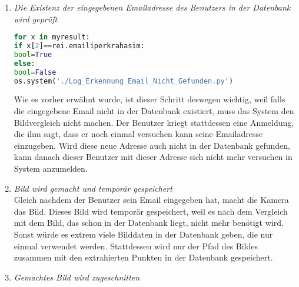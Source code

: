 \begin{enumerate}
Es ist wichtig zu erw{\"a}hnen, es dass für die Umsetzung dieses Systems notwendig ist, die verschiedenen Skripten miteinander zu verbinden.  Deshalb müssen sie innerhalb anderer Skripten angerufen werden. Das wird durch Variablen gemacht. Deshalb ist das Importieren des Pakets sys n{\"o}tig. Der Benutzer gibt seine Emailadresse an, die danach verwendet wird, um in der Datenbank schneller auf die Benutzerbilddaten zuzugreifen. Es wurde deshalb die Emailadresse(und nicht Vorname, Nachname usw.) gewählt, weil diese Adresse immer eindeutig ist, das heißt, es ist unmöglich, dass zwei Benutzern dieselbe Adresse haben, und dasselbe kann für die andere Benutzerdaten(Vorname, Nachname usw.) nicht gesagt werden.
\item \textit{Die Existenz der eingegebenen Emailadresse des Benutzers in der Datenbank wird geprüft} \\
\begin{lstlisting}[language=Python]
for x in myresult:
if x[2]==rei.emailiperkrahasim:
bool=True
else:
bool=False
os.system('./Log_Erkennung_Email_Nicht_Gefunden.py')
\end{lstlisting}
Wie es vorher erwähnt wurde, ist dieser Schritt deswegen wichtig, weil falls die eingegebene Email nicht in der Datenbank existiert, muss das System den Bildvergleich nicht machen. Der Benutzer kriegt stattdessen eine Anmeldung, die ihm sagt, dass er noch einmal versuchen kann seine Emailadresse einzugeben. Wird diese neue Adresse auch nicht in der Datenbank gefunden, kann danach dieser Benutzer mit dieser Adresse sich nicht mehr versuchen in System anzumelden. 
\item \textit{Bild wird gemacht und tempor{\"a}r gespeichert} \\

Gleich nachdem der Benutzer sein Email eingegeben hat, macht die Kamera das Bild. Dieses Bild wird tempor{\"a}r gespeichert, weil es nach dem Vergleich mit dem Bild, das schon in der Datenbank liegt, nicht mehr benötigt wird. Sonst w{\"u}rde es extrem viele Bilddaten in der Datenbank geben, die nur einmal verwendet werden. Stattdessen wird nur der Pfad des Bildes zusammen mit den extrahierten Punkten in der Datenbank gespeichert.
	\item \textit{Gemachtes Bild wird zugeschnitten} \\
	

\end{enumerate}

